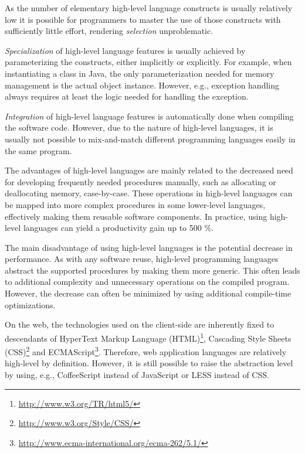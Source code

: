 As the number of elementary high-level language constructs is usually relatively low it is possible for programmers to master the use of those constructs with sufficiently little effort, rendering \emph{selection} unproblematic. \citep[chap.~3]{krueger_software_1992}

\emph{Specialization} of high-level language features is usually achieved by parameterizing the constructs, either implicitly or explicitly. For example, when instantiating a class in Java, the only parameterization needed for memory management is the actual object instance. However, e.g., exception handling always requires at least the logic needed for handling the exception. \citep[chap.~3]{krueger_software_1992}

\emph{Integration} of high-level language features is automatically done when compiling the software code. However, due to the nature of high-level languages, it is usually not possible to mix-and-match different programming languages easily in the same program. \citep[chap.~3]{krueger_software_1992}

The advantages of high-level languages are mainly related to the decreased need for developing frequently needed procedures manually, such as allocating or deallocating memory, case-by-case. These operations in high-level languages can be mapped into more complex procedures in some lower-level languages, effectively making them reusable software components. In practice, using high-level languages can yield a productivity gain up to 500 \%. \citep[chap.~3]{krueger_software_1992}

The main disadvantage of using high-level languages is the potential decrease in performance. As with any software reuse, high-level programming languages abstract the supported procedures by making them more generic. This often leads to additional complexity and unnecessary operations on the compiled program. However, the decrease can often be minimized by using additional compile-time optimizations. \citep{carro_high-level_2006}

On the web, the technologies used on the client-side are inherently fixed to descendants of HyperText Markup Language (HTML)\footnote{\url{http://www.w3.org/TR/html5/}}, Cascading Style Sheets (CSS)\footnote{\url{http://www.w3.org/Style/CSS/}} and ECMAScript\footnote{\url{http://www.ecma-international.org/ecma-262/5.1/}}. Therefore, web application languages are relatively high-level by definition. However, it is still possible to raise the abstraction level by using, e.g., CoffeeScript \citep{ashkenas_coffeescript_2009} instead of JavaScript or LESS \citep{sellier_less_2009} instead of CSS.

